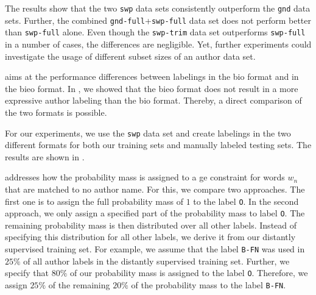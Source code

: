 The results show that the two \texttt{swp} data sets consistently outperform the \texttt{gnd} data sets.
Further, the combined \texttt{gnd-full}+\texttt{swp-full} data set does not perform better than \texttt{swp-full} alone.
Even though the \texttt{swp-trim} data set outperforms \texttt{swp-full} in a number of cases, the differences are negligible.
Yet, further experiments could investigate the usage of different subset sizes of an author data set.

\bigskip

 aims at the performance differences between labelings in the \gls{bio} format and in the \gls{bieo} format.
In , we showed that the \gls{bieo} format does not result in a more expressive author labeling than the \gls{bio} format.
Thereby, a direct comparison of the two formats is possible.

For our experiments, we use the \texttt{swp} data set and create labelings in the two different formats for both our training sets and manually labeled testing sets.
The results are shown in .

\bigskip

 addresses how the probability mass is assigned to a \gls{ge} constraint for words $w_n$ that are matched to no author name.
For this, we compare two approaches.
The first one is to assign the full probability mass of $1$ to the label \texttt{O}.
In the second approach, we only assign a specified part of the probability mass to label \texttt{O}.
The remaining probability mass is then distributed over all other labels.
Instead of specifying this distribution for all other labels, we derive it from our distantly supervised training set.
For example, we assume that the label \texttt{B-FN} was used in $25\%$ of all author labels in the distantly supervised training set.
Further, we specify that $80\%$ of our probability mass is assigned to the label \texttt{O}.
Therefore, we assign $25\%$ of the remaining $20\%$ of the probability mass to the label \texttt{B-FN}.


